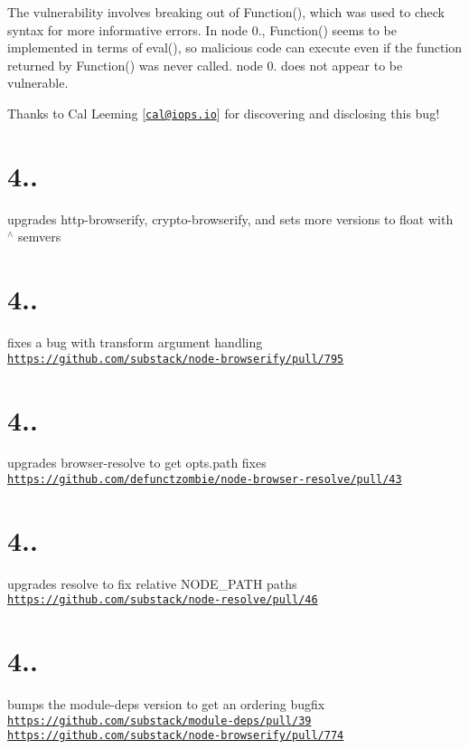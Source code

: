 The vulnerability involves breaking out of {\ttfamily Function()}, which was used to check syntax for more informative errors. In node 0., {\ttfamily Function()} seems to be implemented in terms of {\ttfamily eval()}, so malicious code can execute even if the function returned by {\ttfamily Function()} was never called. node 0. does not appear to be vulnerable.

Thanks to Cal Leeming \mbox{[}\href{mailto:cal@iops.io}{\tt cal@iops.\+io}\mbox{]} for discovering and disclosing this bug!

\section*{4..}

upgrades http-\/browserify, crypto-\/browserify, and sets more versions to float with $^\wedge$ semvers

\section*{4..}

fixes a bug with transform argument handling \href{https://github.com/substack/node-browserify/pull/795}{\tt https\+://github.\+com/substack/node-\/browserify/pull/795}

\section*{4..}

upgrades browser-\/resolve to get opts.\+path fixes \href{https://github.com/defunctzombie/node-browser-resolve/pull/43}{\tt https\+://github.\+com/defunctzombie/node-\/browser-\/resolve/pull/43}

\section*{4..}

upgrades resolve to fix relative N\+O\+D\+E\+\_\+\+P\+A\+TH paths \href{https://github.com/substack/node-resolve/pull/46}{\tt https\+://github.\+com/substack/node-\/resolve/pull/46}

\section*{4..}

bumps the module-\/deps version to get an ordering bugfix \href{https://github.com/substack/module-deps/pull/39}{\tt https\+://github.\+com/substack/module-\/deps/pull/39} \href{https://github.com/substack/node-browserify/pull/774}{\tt https\+://github.\+com/substack/node-\/browserify/pull/774}


